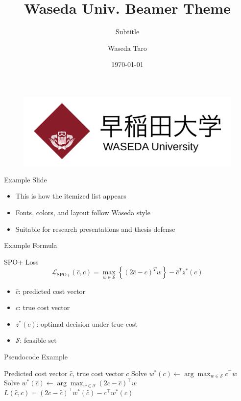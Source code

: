 \documentclass{beamer}
\author{Waseda Taro}
\title{Waseda Univ. Beamer Theme}
\subtitle{Subtitle}
\institute{Waseda University}
\date{\today}
\begin{document}
\begin{frame}
    \vspace{-0.5cm} %
    \begin{figure}[htpb]
        \flushright
        \includegraphics[width=0.4\linewidth]{utils/waseda-university-logo.png} %
    \end{figure}
    \vspace{-0.5cm}
    \titlepage
\end{frame}

\begin{frame}{Example Slide}
    \begin{itemize}
        \item This is how the itemized list appears
        \item Fonts, colors, and layout follow Waseda style
        \item Suitable for research presentations and thesis defense
    \end{itemize}
\end{frame}

\begin{frame}{Example Formula}
    \begin{block}{SPO+ Loss}
        \begin{equation*}
            \mathcal{L}_{\text{SPO+}}(\hat{c}, c) = \max_{w \in \mathcal{S}} \left\{ (2\hat{c} - c)^T w \right\} - \hat{c}^T z^*(c)
        \end{equation*}
    \end{block}

    \vspace{0.5em}

    \begin{itemize}
        \item $\hat{c}$: predicted cost vector
        \item $c$: true cost vector
        \item $z^*(c)$: optimal decision under true cost
        \item $\mathcal{S}$: feasible set
    \end{itemize}
\end{frame}

\begin{frame}{Pseudocode Example}
\begin{algorithm}[H]
\caption{SPO+ Loss}
\begin{algorithmic}[1]
\Require Predicted cost vector $\hat{c}$, true cost vector $c$
\State Solve $w^*(c) \gets \arg\max_{w \in \mathcal{S}} c^\top w$
\State Solve $w^*(\hat{c}) \gets \arg\max_{w \in \mathcal{S}} (2c - \hat{c})^\top w$
\State \Return $L(\hat{c}, c) = (2c - \hat{c})^\top w^*(\hat{c}) - c^\top w^*(c)$
\end{algorithmic}
\end{algorithm}
\end{frame}
\end{document}
